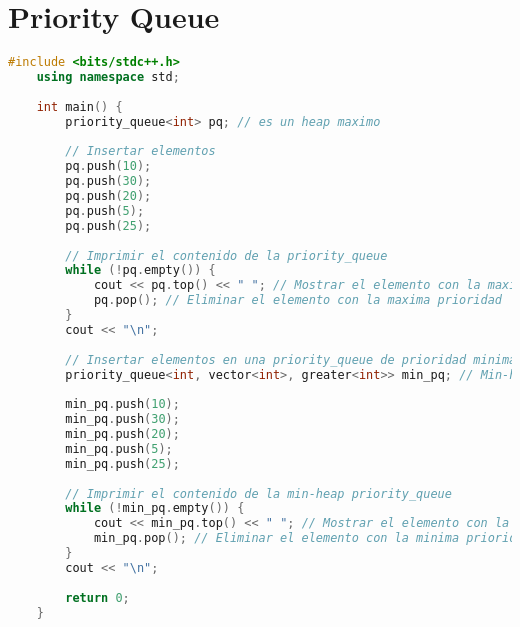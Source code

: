 
\section*{Priority Queue}

\begin{lstlisting}[language=C++]
	#include <bits/stdc++.h>
	using namespace std;
	
	int main() {
		priority_queue<int> pq; // es un heap maximo
		
		// Insertar elementos
		pq.push(10); 
		pq.push(30);
		pq.push(20);
		pq.push(5);
		pq.push(25);
		
		// Imprimir el contenido de la priority_queue
		while (!pq.empty()) {
			cout << pq.top() << " "; // Mostrar el elemento con la maxima prioridad
			pq.pop(); // Eliminar el elemento con la maxima prioridad
		}
		cout << "\n";
		
		// Insertar elementos en una priority_queue de prioridad minima (min-heap)
		priority_queue<int, vector<int>, greater<int>> min_pq; // Min-heap
		
		min_pq.push(10);
		min_pq.push(30);
		min_pq.push(20);
		min_pq.push(5);
		min_pq.push(25);
		
		// Imprimir el contenido de la min-heap priority_queue
		while (!min_pq.empty()) {
			cout << min_pq.top() << " "; // Mostrar el elemento con la minima prioridad
			min_pq.pop(); // Eliminar el elemento con la minima prioridad
		}
		cout << "\n";
		
		return 0;
	}

\end{lstlisting}
